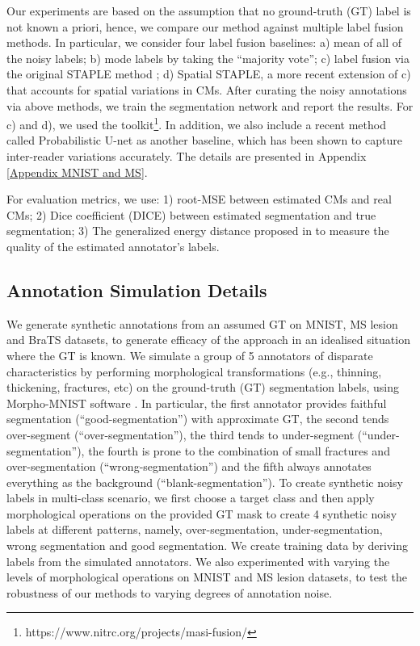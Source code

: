 Our experiments are based on the assumption that no ground-truth (GT) label is not known a priori, hence, we compare our method against multiple label fusion methods. In particular, we consider four label fusion baselines: a) mean of all of the noisy labels; b) mode labels by taking the ``majority vote''; c) label fusion via the original STAPLE method \cite{warfield2004simultaneous}; d) Spatial STAPLE, a more recent extension of c) that accounts for spatial variations in CMs. After curating the noisy annotations via above methods, we train the segmentation network and report the results. For c) and d), we used the toolkit\footnote{https://www.nitrc.org/projects/masi-fusion/}. In addition, we also include a recent method called Probabilistic U-net as another baseline, which has been shown to capture inter-reader variations accurately. The details are presented in Appendix \ref{Appendix MNIST and MS}. 

For evaluation metrics, we use: 1) root-MSE between estimated CMs and real CMs; 2) Dice coefficient (DICE) between estimated segmentation and true segmentation; 3) The generalized energy distance proposed in \cite{kohl2018probabilistic} to measure the quality of the estimated annotator's labels. 

\subsection{Annotation Simulation Details}
We generate synthetic annotations from an assumed GT on MNIST, MS lesion and BraTS datasets, to generate efficacy of the approach in an idealised situation where the GT is known. We simulate a group of 5 annotators of disparate characteristics by performing morphological transformations (e.g., thinning, thickening, fractures, etc) on the ground-truth (GT) segmentation labels, using Morpho-MNIST software \cite{castro2019morphomnist}. In particular, the first annotator provides faithful segmentation (``good-segmentation'') with approximate GT, the second tends over-segment (``over-segmentation''), the third tends to under-segment (``under-segmentation''), the fourth is prone to the combination of small fractures and over-segmentation (``wrong-segmentation'') and the fifth always annotates everything as the background (``blank-segmentation''). To create synthetic noisy labels in multi-class scenario, we first choose a target class and then apply morphological operations on the provided GT mask to create 4 synthetic noisy labels at different patterns, namely, over-segmentation, under-segmentation, wrong segmentation and good segmentation. We create training data by deriving labels from the simulated annotators. We also experimented with varying the levels of morphological operations on MNIST and MS lesion datasets, to test the robustness of our methods to varying degrees of annotation noise.

